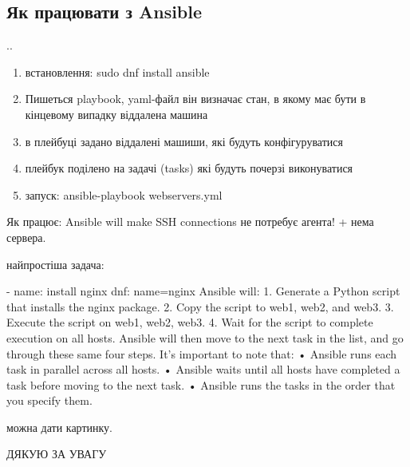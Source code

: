 \documentclass[pdf, 8pt, unicode, t]{beamer} %
\newcommand{\bluetext}[1]{{\usebeamercolor[fg]{bluetext_color}#1}}
\newcommand{\myinsertsubsection}{\alert{\Large\insertsectionnumber.\insertsubsectionnumber. \insertsubsection}}
\begin{document}
\subsection{Як працювати з Ansible}
\begin{frame}[label=none]
%
\myinsertsubsection

\begin{enumerate}
\item встановлення: sudo dnf install ansible
\item Пишеться playbook, yaml-файл
він визначає стан, в якому має бути в кінцевому випадку віддалена машина
\item в плейбуці задано віддалені машиши, які будуть конфігуруватися
\item плейбук поділено на задачі (tasks) які будуть почерзі виконуватися
\item запуск: ansible-playbook webservers.yml
\end{enumerate}

Як працює:
Ansible will make SSH connections
не потребує агента! + нема сервера.

найпростіша задача:

- name: install nginx
  dnf: name=nginx
Ansible will:
1. Generate a Python script that installs the nginx package.
2. Copy the script to web1, web2, and web3.
3. Execute the script on web1, web2, web3.
4. Wait for the script to complete execution on all hosts.
Ansible will then move to the next task in the list, and go through these same four
steps. It’s important to note that:
• Ansible runs each task in parallel across all hosts.
• Ansible waits until all hosts have completed a task before moving to the next task.
• Ansible runs the tasks in the order that you specify them.

можна дати картинку.

\end{frame}
\begin{frame}[plain,c,label=thanks]
\begin{center}
\textrm{\bluetext{\Large ДЯКУЮ ЗА УВАГУ}}
\end{center}
\end{frame}
\end{document}
